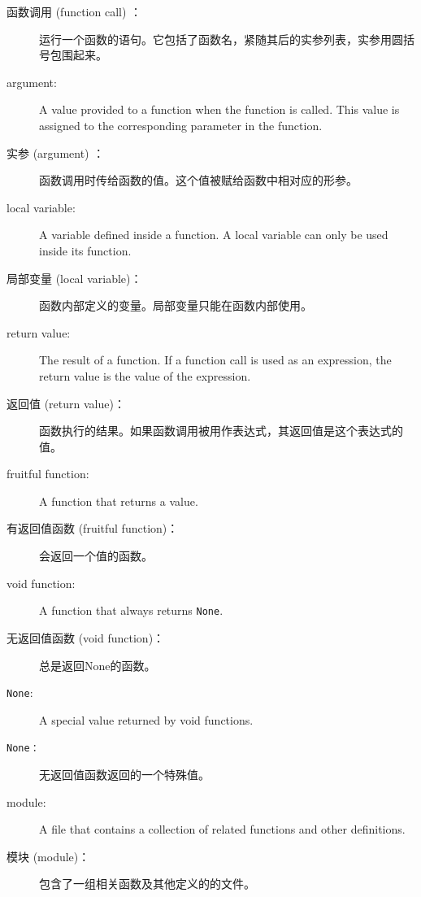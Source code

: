 \begin{description}
\item[函数调用 (function call) ：] 运行一个函数的语句。它包括了函数名，紧随其后的实参列表，实参用圆括号包围起来。

\item[argument:]  A value provided to a function when the function is called.
This value is assigned to the corresponding parameter in the function.

\item[实参 (argument) ：] 函数调用时传给函数的值。这个值被赋给函数中相对应的形参。

\item[local variable:]  A variable defined inside a function.  A local
variable can only be used inside its function.

\item[局部变量 (local variable)：] 函数内部定义的变量。局部变量只能在函数内部使用。

\item[return value:]  The result of a function.  If a function call
is used as an expression, the return value is the value of
the expression.

\item[返回值 (return value)：] 函数执行的结果。如果函数调用被用作表达式，其返回值是这个表达式的值。

\item[fruitful function:] A function that returns a value.

\item[有返回值函数 (fruitful function)：] 会返回一个值的函数。

\item[void function:] A function that always returns {\tt None}.

\item[无返回值函数 (void function)：]     总是返回None的函数。


\item[{\tt None}:]  A special value returned by void functions.

\item[\tt None：] 无返回值函数返回的一个特殊值。


\item[module:] A file that contains a
collection of related functions and other definitions.

\item[模块 (module)：] 包含了一组相关函数及其他定义的的文件。


\end{description}
